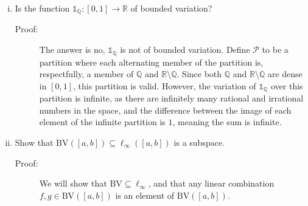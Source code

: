 \documentclass[10pt]{extarticle}
\newcommand{\Q}{\mathbb{Q}}
\newcommand{\R}{\mathbb{R}}
\begin{document}
  \begin{enumerate}[(i)]
    \item Is the function $\mathbb{1}_{\Q}: [0,1]\rightarrow \R$ of bounded variation?
      \begin{description}
        \item[Proof:] The answer is no, $\mathbb{1}_{\Q}$ is not of bounded variation. Define $\mathcal{P}$ to be a partition where each alternating member of the partition is, respectfully, a member of $\Q$ and $\R\setminus\Q$. Since both $\Q$ and $\R\setminus\Q$ are dense in $[0,1]$, this partition is valid. However, the variation of $\mathbb{1}_{\Q}$ over this partition is infinite, as there are infinitely many rational and irrational numbers in the space, and the difference between the image of each element of the infinite partition is $1$, meaning the sum is infinite.
      \end{description}
    \item Show that $\text{BV}([a,b])\subseteq \ell_{\infty}([a,b])$ is a subspace.
      \begin{description}
        \item[Proof:] We will show that $\text{BV}\subseteq \ell_{\infty}$, and that any linear combination $f,g\in \text{BV}([a,b])$ is an element of $\text{BV}([a,b])$.\\


\end{description}
\end{enumerate}
\end{document}

